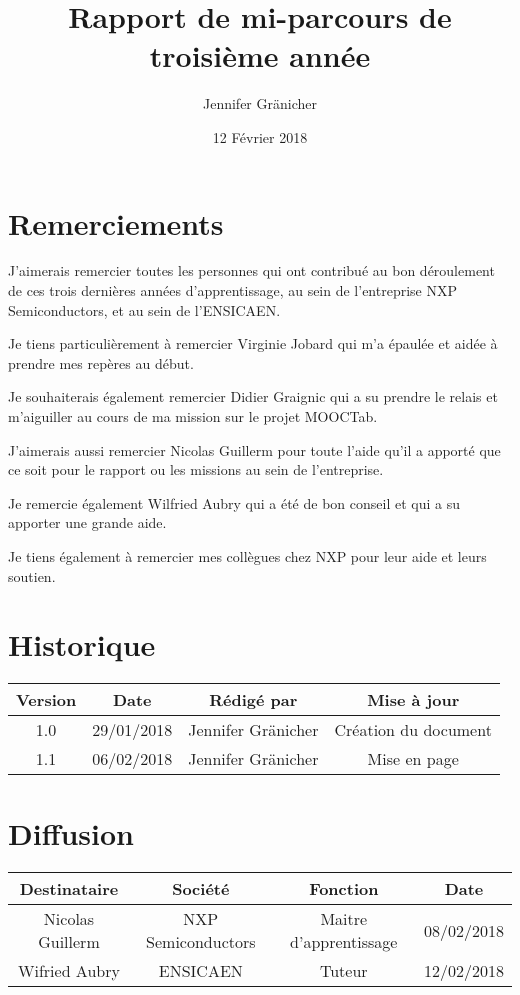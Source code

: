 \documentclass[french,11pt,a4paper,titlepage,openright,openbib]{report}
\begin{document}
\title{Rapport de mi-parcours de troisième année}
\author{Jennifer Gr\"{a}nicher}
\date{12 Février 2018}
\maketitle

\chapter*{Remerciements}

J'aimerais remercier toutes les personnes qui ont contribué au bon déroulement de ces trois dernières années d'apprentissage, au sein de l'entreprise NXP Semiconductors, et au sein de l'ENSICAEN.

Je tiens particulièrement à remercier Virginie Jobard qui m'a épaulée et aidée à prendre mes repères au début.

Je souhaiterais également remercier Didier Graignic qui a su prendre le relais et m'aiguiller au cours de ma mission sur le projet MOOCTab.

J'aimerais aussi remercier Nicolas Guillerm pour toute l'aide qu'il a apporté que ce soit pour le rapport ou les missions au sein de l'entreprise.

Je remercie également Wilfried Aubry qui a été de bon conseil et qui a su apporter une grande aide.

Je tiens également à remercier mes collègues chez NXP pour leur aide et leurs soutien.


\tableofcontents

\chapter*{Historique}
\begin{table}[ht]
	\label{tab:historique}
	\centering
	\begin{tabular}{|c|c|c|c|}
		\hline
		{\bf Version} & {\bf Date} & {\bf Rédigé par}    & {\bf Mise à jour}    \\
		\hline
		1.0           & 29/01/2018 & Jennifer Gränicher  & Création du document \\
		\hline
		1.1           & 06/02/2018 & Jennifer Gränicher  & Mise en page \\
		\hline
	\end{tabular}
\end{table}

{\let \clearpage \relax \chapter*{Diffusion}}
\begin{table}[ht]
	\label{tab:diffusion}
	\centering
	\begin{tabular}{|c|c|c|c|}
		\hline
		{\bf Destinataire} & {\bf Société}      & {\bf Fonction}   		 & {\bf Date}\\
		\hline
		Nicolas Guillerm   & NXP Semiconductors & Maitre d'apprentissage & 08/02/2018 \\
		\hline
		Wifried Aubry      & ENSICAEN 			& Tuteur				 & 12/02/2018 \\
		\hline
	\end{tabular}
\end{table}
\end{document}
